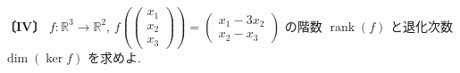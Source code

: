 \noindent\textbf{〔IV〕}
$f:\mathbb{R}^3\to\mathbb{R}^2$,
$f\!\left(\begin{pmatrix}x_1\\x_2\\x_3\end{pmatrix}\right)
=\begin{pmatrix}x_1-3x_2\\x_2-x_3\end{pmatrix}$
の階数 $\operatorname{rank}(f)$ と退化次数 $\dim(\ker f)$ を求めよ.
